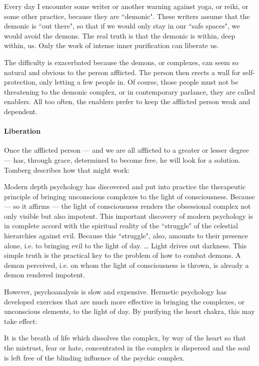 Every day I encounter some writer or another warning against yoga, or reiki, or some other practice, because they are ``demonic". These writers assume that the demonic is ``out there", so that if we would only stay in our ``safe spaces", we would avoid the demons. The real truth is that the demonic is within, deep within, us. Only the work of intense inner purification can liberate us.

The difficulty is exacerbated because the demons, or complexes, can seem so natural and obvious to the person afflicted. The person then erects a wall for self-protection, only letting a few people in. Of course, those people must not be threatening to the demonic complex, or in contemporary parlance, they are called enablers. All too often, the enablers prefer to keep the afflicted person weak and dependent.

\paragraph{Liberation}
Once the afflicted person — and we are all afflicted to a greater or lesser degree — has, through grace, determined to become free, he will look for a solution. Tomberg describes how that might work:

\begin{quotex}
Modern depth psychology has discovered and put into practice the therapeutic principle of bringing unconscious complexes to the light of consciousness. Because — so it affirms — the light of consciousness renders the obsessional complex not only visible but also impotent. This important discovery of modern psychology is in complete accord with the spiritual reality of the ``struggle" of the celestial hierarchies against evil. Because this ``struggle", also, amounts to their presence alone, i.e. to bringing evil to the light of day. … Light drives out darkness. This simple truth is the practical key to the problem of how to combat demons. A demon perceived, i.e. on whom the light of consciousness is thrown, is already a demon rendered impotent. 

\end{quotex}
However, psychoanalysis is slow and expensive. Hermetic psychology has developed exercises that are much more effective in bringing the complexes, or unconscious elements, to the light of day. By purifying the heart chakra, this may take effect:

\begin{quotex}
It is the breath of life which dissolves the complex, by way of the heart so that the mistrust, fear or hate, concentrated in the complex is dispersed and the soul is left free of the blinding influence of the psychic complex. 

\end{quotex}
